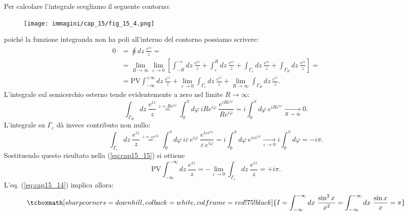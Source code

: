 \documentclass[a4paper,12pt,oneside]{book}
\begin{document}
Per calcolare l'integrale scegliamo il seguente contorno:
\begin{figure}[!htbp]
\begin{center}
\texttt{[image: immagini/cap\_15/fig\_15\_4.png]}
\end{center}
\end{figure}
poiché la funzione integranda non ha poli all'interno del contorno possiamo scrivere:
	\begin{align}
		0 & =  \oint  dz\ \frac{e^{iz}}{z} = \nonumber \\
		&= \lim _{R\rightarrow \infty} \lim _{\varepsilon\rightarrow 0} \left[ \int _{-R} ^{-\varepsilon}dz\ \frac{e^{iz}}{z}+\int _{\varepsilon} ^{R}dz\ \frac{e^{iz}}{z}+\int _{\Gamma _{\varepsilon}} dz\ \frac{e^{iz}}{z} +\int _{\Gamma _{R}} dz\ \frac{e^{iz}}{z}\right] = \nonumber\\
		&= \textrm{PV}\int _{-\infty} ^{+\infty}dz\ \frac{e^{iz}}{z}+ \lim _{\varepsilon\rightarrow 0}  \int _{\Gamma _{\varepsilon}} dz\ \frac{e^{iz}}{z}+\lim _{R\rightarrow \infty}\int _{\Gamma _{R}} dz\ \frac{e^{iz}}{z}.
	\label{eq:cap15_15}
	\end{align}
L'integrale sul semicerchio esterno tende evidentemente a zero nel limite $R\rightarrow \infty $:
	\begin{equation}
		\int _{\Gamma _{R}} dz\ \frac{e^{iz}}{z} \overset{z= Re^{i\varphi}}{=} \int _0 ^{\pi} d\varphi \ i R e^{i\varphi}\ \frac{e^{iRe^{i\varphi}}}{Re^{i\varphi}} = i\int _0 ^{\pi} d\varphi \ e^{iRe^{i\varphi}} \underset{R\rightarrow \infty}{\longrightarrow}0.
	\end{equation}
L'integrale su $\Gamma _{\varepsilon}$ dà invece contributo non nullo:
	\begin{equation}
		\int _{\Gamma _{\varepsilon}} dz\ \frac{e^{iz}}{z} \overset{z= \varepsilon e^{i\varphi}}{=} \int _0 ^{\pi} d\varphi \ i \varepsilon\, e^{i\varphi}\ \frac{e^{i\varepsilon  e^{i\varphi}}}{\varepsilon\, e^{i\varphi}} =  i\int _0 ^{\pi} d\varphi \ e^{i\varepsilon e^{i\varphi}} \underset{\varepsilon\rightarrow 0}{\longrightarrow}i\int _0 ^{\pi} d\varphi = -i\pi.
	\end{equation}
Sostituendo questo risultato nella (\ref{eq:cap15_15}) si ottiene
	\begin{equation}
		\textrm{PV} \int _{-\infty} ^{-\infty} dz\ \frac{e^{iz}}{z} =-\lim _{\varepsilon \rightarrow 0} \int _{\Gamma _{\varepsilon}} dz\ \frac{e^{iz}}{z}= +i\pi.
	\end{equation}
L'eq. (\ref{eq:cap15_14}) implica allora:
	\begin{equation}
		\tcboxmath[sharp corners=downhill, colback=white, colframe=red!75!black]{
			I= \int _{-\infty} ^{-\infty} dx\ \frac{\sin ^2  x}{x^2}= \int _{-\infty} ^{-\infty} dx\ \frac{\sin  x}{x}= \pi
			}
	\end{equation}
\newpage
\end{document}
